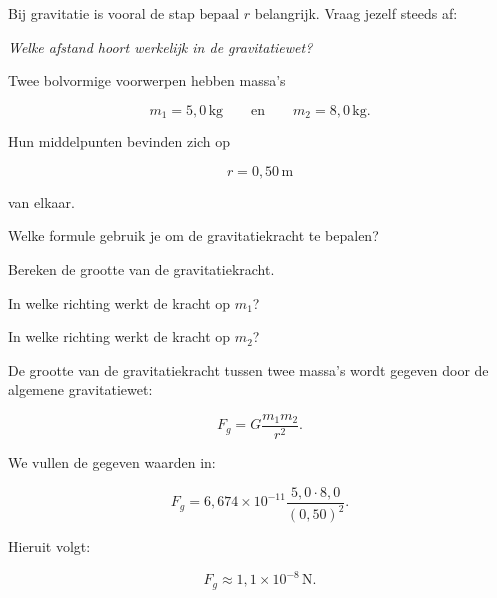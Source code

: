 \documentclass{ximera}
\begin{document}
Bij gravitatie is vooral de stap \(
\boxed{\text{bepaal }r}
\) belangrijk. Vraag jezelf steeds af:

\begin{center}
\textit{Welke afstand hoort werkelijk in de gravitatiewet?}
\end{center}



\begin{oefening}{\oefB\ESS}

Twee bolvormige voorwerpen hebben massa's

\[
m_1=5{,}0\,\mathrm{kg}
\qquad\text{en}\qquad
m_2=8{,}0\,\mathrm{kg}.
\]

Hun middelpunten bevinden zich op

\[
r=0{,}50\,\mathrm m
\]

van elkaar.

\begin{question}
Welke formule gebruik je om de gravitatiekracht te bepalen?
\end{question}

\begin{question}
Bereken de grootte van de gravitatiekracht.
\end{question}

\begin{question}
In welke richting werkt de kracht op $m_1$?
\end{question}

\begin{question}
In welke richting werkt de kracht op $m_2$?
\end{question}

\begin{oplossing}

      De grootte van de gravitatiekracht tussen twee massa's wordt gegeven
      door de algemene gravitatiewet:
      
      \[
      \boxed{
      F_g=G\frac{m_1m_2}{r^2}.
      }
      \]
      
      We vullen de gegeven waarden in:
      
      \[
      F_g
      =
      6{,}674\times10^{-11}
      \frac{5{,}0\cdot8{,}0}{(0{,}50)^2}.
      \]
      
      Hieruit volgt:
      
      \[
      \boxed{
      F_g\approx1{,}1\times10^{-8}\,\mathrm N.
      }
      \]
      

\end{oplossing}
\end{oefening}
\end{document}
